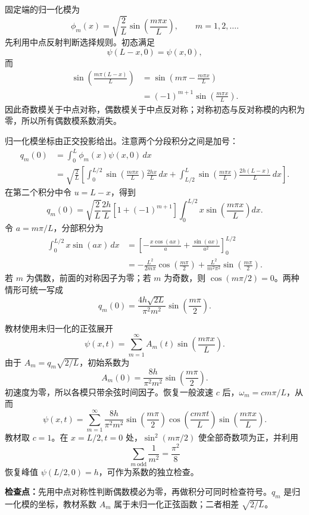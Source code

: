 \begin{checkedsolution}
固定端的归一化模为
\[
  \phi_m(x)=\sqrt{\frac2L}\sin\left(\frac{m\pi x}{L}\right),
  \qquad m=1,2,\ldots.
\]
先利用中点反射判断选择规则。初态满足
\[
  \psi(L-x,0)=\psi(x,0),
\]
而
\begin{align*}
  \sin\left(\frac{m\pi(L-x)}L\right)
  &=\sin\left(m\pi-\frac{m\pi x}{L}\right)\\
  &=(-1)^{m+1}\sin\left(\frac{m\pi x}{L}\right).
\end{align*}
因此奇数模关于中点对称，偶数模关于中点反对称；对称初态与反对称模的内积为零，所以所有偶数模系数消失。

归一化模坐标由正交投影给出。注意两个分段积分之间是加号：
\begin{align*}
  q_m(0)
  &=\int_0^L\phi_m(x)\psi(x,0)\,dx\\
  &=\sqrt{\frac2L}\left[
    \int_0^{L/2}
      \sin\left(\frac{m\pi x}{L}\right)\frac{2hx}{L}\,dx
    +\int_{L/2}^{L}
      \sin\left(\frac{m\pi x}{L}\right)
      \frac{2h(L-x)}{L}\,dx
    \right].
\end{align*}
在第二个积分中令 $u=L-x$，得到
\begin{equation*}
  q_m(0)
  =\sqrt{\frac2L}\frac{2h}{L}
    \left[1+(-1)^{m+1}\right]
    \int_0^{L/2}x
      \sin\left(\frac{m\pi x}{L}\right)dx.
\end{equation*}
令 $a=m\pi/L$，分部积分为
\begin{align*}
  \int_0^{L/2}x\sin(ax)\,dx
  &=\left[-\frac{x\cos(ax)}a
    +\frac{\sin(ax)}{a^2}\right]_0^{L/2}\\
  &=-\frac{L^2}{2m\pi}\cos\left(\frac{m\pi}{2}\right)
    +\frac{L^2}{m^2\pi^2}
      \sin\left(\frac{m\pi}{2}\right).
\end{align*}
若 $m$ 为偶数，前面的对称因子为零；若 $m$ 为奇数，则 $\cos(m\pi/2)=0$。两种情形可统一写成
\begin{equation}
  \boxed{
  q_m(0)=\frac{4h\sqrt{2L}}{\pi^2m^2}
  \sin\left(\frac{m\pi}{2}\right).}
  \label{eq:QM-C01-S10-E04-normalized-coefficient}
\end{equation}

教材使用未归一化的正弦展开
\[
  \psi(x,t)=\sum_{m=1}^{\infty}
  A_m(t)\sin\left(\frac{m\pi x}{L}\right).
\]
由于 $A_m=q_m\sqrt{2/L}$，初始系数为
\begin{equation}
  \boxed{
  A_m(0)=\frac{8h}{\pi^2m^2}
  \sin\left(\frac{m\pi}{2}\right).}
  \label{eq:QM-C01-S10-E04-unnormalized-coefficient}
\end{equation}
初速度为零，所以各模只带余弦时间因子。恢复一般波速 $c$ 后，$\omega_m=cm\pi/L$，从而
\begin{equation}
  \boxed{
  \psi(x,t)=\sum_{m=1}^{\infty}
  \frac{8h}{\pi^2m^2}
  \sin\left(\frac{m\pi}{2}\right)
  \cos\left(\frac{cm\pi t}{L}\right)
  \sin\left(\frac{m\pi x}{L}\right).}
  \label{eq:QM-C01-S10-E04-string-evolution}
\end{equation}
教材取 $c=1$。在 $x=L/2,t=0$ 处，$\sin^2(m\pi/2)$ 使全部奇数项为正，并利用
\[
  \sum_{m\ \mathrm{odd}}\frac1{m^2}=\frac{\pi^2}{8}
\]
恢复峰值 $\psi(L/2,0)=h$，可作为系数的独立检查。
\end{checkedsolution}

\textbf{检查点：}先用中点对称性判断偶数模必为零，再做积分可同时检查符号。$q_m$ 是归一化模的坐标，教材系数 $A_m$ 属于未归一化正弦函数；二者相差 $\sqrt{2/L}$。
